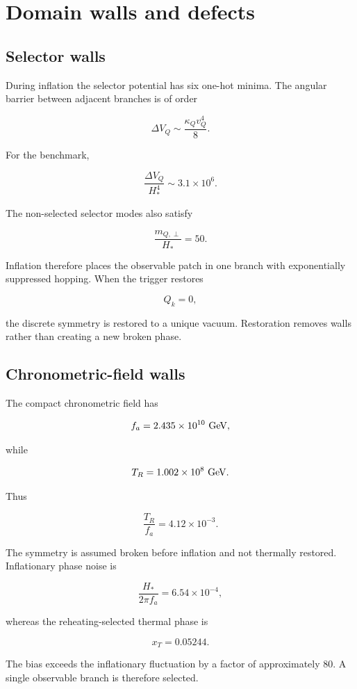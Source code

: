 \documentclass[
  10pt,
]{article}
\begin{document}
\section{Domain walls and defects}\label{domain-walls-and-defects}

\subsection{Selector walls}\label{selector-walls}

During inflation the selector potential has six one-hot minima. The
angular barrier between adjacent branches is of order

\[
\Delta V_Q
\sim
\frac{\kappa_Qv_Q^4}{8}.
\]

For the benchmark,

\[
\frac{\Delta V_Q}{H_*^4}
\sim3.1\times10^6.
\]

The non-selected selector modes also satisfy

\[
\frac{m_{Q,\perp}}{H_*}=50.
\]

Inflation therefore places the observable patch in one branch with
exponentially suppressed hopping. When the trigger restores

\[
Q_k=0,
\]

the discrete symmetry is restored to a unique vacuum. Restoration
removes walls rather than creating a new broken phase.

\subsection{Chronometric-field walls}\label{chronometric-field-walls}

The compact chronometric field has

\[
f_a=2.435\times10^{10}\ {\rm GeV},
\]

while

\[
T_R=1.002\times10^8\ {\rm GeV}.
\]

Thus

\[
\frac{T_R}{f_a}=4.12\times10^{-3}.
\]

The symmetry is assumed broken before inflation and not thermally
restored. Inflationary phase noise is

\[
\frac{H_*}{2\pi f_a}
=6.54\times10^{-4},
\]

whereas the reheating-selected thermal phase is

\[
x_T=0.05244.
\]

The bias exceeds the inflationary fluctuation by a factor of
approximately 80. A single observable branch is therefore selected.
\end{document}
